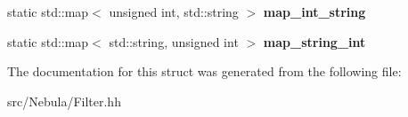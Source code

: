 \begin{DoxyCompactItemize}
\item 
\hypertarget{structNeb_1_1Filter_1_1Filter_afd357998a65a640858d9b9d1f8e729d5}{static std\-::map$<$ unsigned int, \*
std\-::string $>$ {\bfseries map\-\_\-int\-\_\-string}}\label{structNeb_1_1Filter_1_1Filter_afd357998a65a640858d9b9d1f8e729d5}

\item 
\hypertarget{structNeb_1_1Filter_1_1Filter_ac43b100f5e97bcf435218cec70f0ebba}{static std\-::map$<$ std\-::string, \*
unsigned int $>$ {\bfseries map\-\_\-string\-\_\-int}}\label{structNeb_1_1Filter_1_1Filter_ac43b100f5e97bcf435218cec70f0ebba}

\end{DoxyCompactItemize}


\-The documentation for this struct was generated from the following file\-:\begin{DoxyCompactItemize}
\item 
src/\-Nebula/\-Filter.\-hh\end{DoxyCompactItemize}
